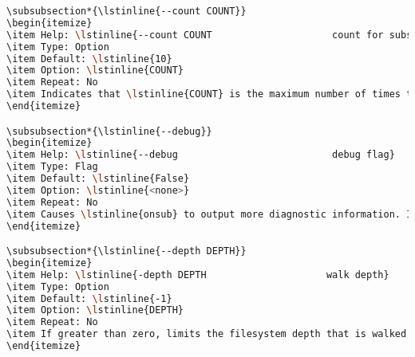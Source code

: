 \begin{snugshade}
\begin{lstlisting}[language=bash]
\subsubsection*{\lstinline{--count COUNT}}
\begin{itemize}
\item Help: \lstinline{--count COUNT                     count for substitutions}
\item Type: Option
\item Default: \lstinline{10}
\item Option: \lstinline{COUNT}
\item Repeat: No
\item Indicates that \lstinline{COUNT} is the maximum number of times to recursively substitute configuration entries to prevent infinite recursion.
\end{itemize}

\subsubsection*{\lstinline{--debug}}
\begin{itemize}
\item Help: \lstinline{--debug                           debug flag}
\item Type: Flag
\item Default: \lstinline{False}
\item Option: \lstinline{<none>}
\item Repeat: No
\item Causes \lstinline{onsub} to output more diagnostic information. Is also passed to \lstinline{py:} functions where they occur in configuration entries.
\end{itemize}

\subsubsection*{\lstinline{--depth DEPTH}}
\begin{itemize}
\item Help: \lstinline{-depth DEPTH                     walk depth}
\item Type: Option
\item Default: \lstinline{-1}
\item Option: \lstinline{DEPTH}
\item Repeat: No
\item If greater than zero, limits the filesystem depth that is walked by \lstinline{onsub} to folder entries with up to \lstinline{DEPTH}-many subdirectories.
\end{itemize}


\end{lstlisting}
\end{snugshade}
